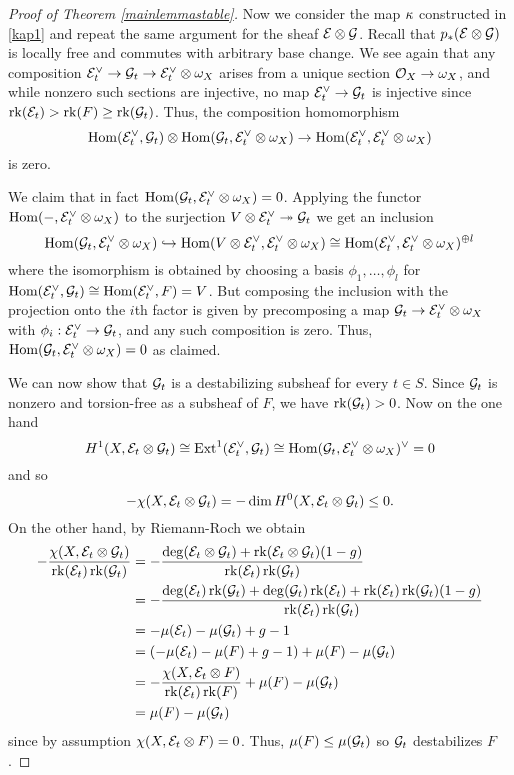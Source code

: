 \documentclass[letterpaper,12pt]{amsart}
\theoremstyle{remark}
\begin{document}
\begin{proof}[Proof of Theorem \ref{mainlemmastable}]
Now we consider the map $\kappa$ constructed in \eqref{kap1} and repeat the same argument for the sheaf $\mathcal{E} \otimes \mathcal{G}$. Recall that $p_*(\mathcal{E} \otimes \mathcal{G})$ is locally free and commutes with arbitrary base change. We see again that any composition $\mathcal{E}_t^\vee \to \mathcal{G}_t \to \mathcal{E}_t^\vee \otimes \omega_X$ arises from a unique section $\mathcal{O}_X \to \omega_X$, and while nonzero such sections are injective, no map $\mathcal{E}_t^\vee \to \mathcal{G}_t$ is injective since $\operatorname{\mathrm{rk}}(\mathcal{E}_t) > \operatorname{\mathrm{rk}}(F) \ge \operatorname{\mathrm{rk}}(\mathcal{G}_t)$. Thus, the composition homomorphism
\[ \mathrm{Hom}(\mathcal{E}_t^\vee, \mathcal{G}_t) \otimes \mathrm{Hom}(\mathcal{G}_t, \mathcal{E}_t^\vee \otimes \omega_X) \to \mathrm{Hom}(\mathcal{E}_t^\vee, \mathcal{E}_t^\vee \otimes \omega_X) \]
is zero. 

We claim that in fact $\mathrm{Hom}(\mathcal{G}_t, \mathcal{E}_t^\vee \otimes \omega_X) = 0$. Applying the functor $\mathrm{Hom}(-, \mathcal{E}_t^\vee \otimes \omega_X)$ to the surjection $V \otimes \mathcal{E}_t^\vee \twoheadrightarrow \mathcal{G}_t$ we get an inclusion
\[ \mathrm{Hom}(\mathcal{G}_t, \mathcal{E}_t^\vee \otimes \omega_X) \hookrightarrow \mathrm{Hom}(V \otimes \mathcal{E}_t^\vee, \mathcal{E}_t^\vee \otimes \omega_X) \cong \mathrm{Hom}(\mathcal{E}_t^\vee, \mathcal{E}_t^\vee \otimes \omega_X)^{\oplus l} \]
where the isomorphism is obtained by choosing a basis $\phi_1, \ldots, \phi_l$ for $\mathrm{Hom}(\mathcal{E}_t^\vee, \mathcal{G}_t) \cong \mathrm{Hom}(\mathcal{E}_t^\vee, F) = V$. But composing the inclusion with the projection onto the $i$th factor is given by precomposing a map $\mathcal{G}_t \to \mathcal{E}_t^\vee \otimes \omega_X$ with $\phi_i: \mathcal{E}_t^\vee \to \mathcal{G}_t$, and any such composition is zero. Thus, $\mathrm{Hom}(\mathcal{G}_t, \mathcal{E}_t^\vee \otimes \omega_X) = 0$ as claimed.

We can now show that $\mathcal{G}_t$ is a destabilizing subsheaf for every $t \in S$. Since $\mathcal{G}_t$ is nonzero and torsion-free as a subsheaf of $F$, we have $\operatorname{\mathrm{rk}}(\mathcal{G}_t) > 0$. Now on the one hand
\[ H^1(X, \mathcal{E}_t \otimes \mathcal{G}_t) \cong \mathrm{Ext}^1(\mathcal{E}_t^\vee, \mathcal{G}_t) \cong \mathrm{Hom}(\mathcal{G}_t, \mathcal{E}_t^\vee \otimes \omega_X)^\vee = 0 \]
and so
\[ -\chi(X, \mathcal{E}_t \otimes \mathcal{G}_t) = -\dim H^0(X, \mathcal{E}_t \otimes \mathcal{G}_t) \le 0. \]
On the other hand, by Riemann-Roch we obtain
\begin{align*}
    -\frac{\chi(X, \mathcal{E}_t \otimes \mathcal{G}_t)}{\operatorname{\mathrm{rk}}(\mathcal{E}_t) \operatorname{\mathrm{rk}}(\mathcal{G}_t)} & = -\frac{\deg(\mathcal{E}_t \otimes \mathcal{G}_t) + \operatorname{\mathrm{rk}}(\mathcal{E}_t \otimes \mathcal{G}_t)(1-g)}{\operatorname{\mathrm{rk}}(\mathcal{E}_t) \operatorname{\mathrm{rk}}(\mathcal{G}_t)} \\
    & = -\frac{\deg(\mathcal{E}_t)\operatorname{\mathrm{rk}}(\mathcal{G}_t) + \deg(\mathcal{G}_t)\operatorname{\mathrm{rk}}(\mathcal{E}_t) + \operatorname{\mathrm{rk}}(\mathcal{E}_t)\operatorname{\mathrm{rk}}(\mathcal{G}_t)(1-g)}{\operatorname{\mathrm{rk}}(\mathcal{E}_t) \operatorname{\mathrm{rk}}(\mathcal{G}_t)} \\
    & = -\mu(\mathcal{E}_t) - \mu(\mathcal{G}_t) + g - 1 \\
    & = (-\mu(\mathcal{E}_t) - \mu(F) + g - 1) + \mu(F) - \mu(\mathcal{G}_t) \\
    & = -\frac{\chi(X, \mathcal{E}_t \otimes F)}{\operatorname{\mathrm{rk}}(\mathcal{E}_t)\operatorname{\mathrm{rk}}(F)} + \mu(F) - \mu(\mathcal{G}_t) \\
    & = \mu(F) - \mu(\mathcal{G}_t)
\end{align*}
since by assumption $\chi(X, \mathcal{E}_t \otimes F) = 0$. Thus, $\mu(F) \le \mu(\mathcal{G}_t)$ so $\mathcal{G}_t$ destabilizes $F$.
\end{proof}
\end{document}
